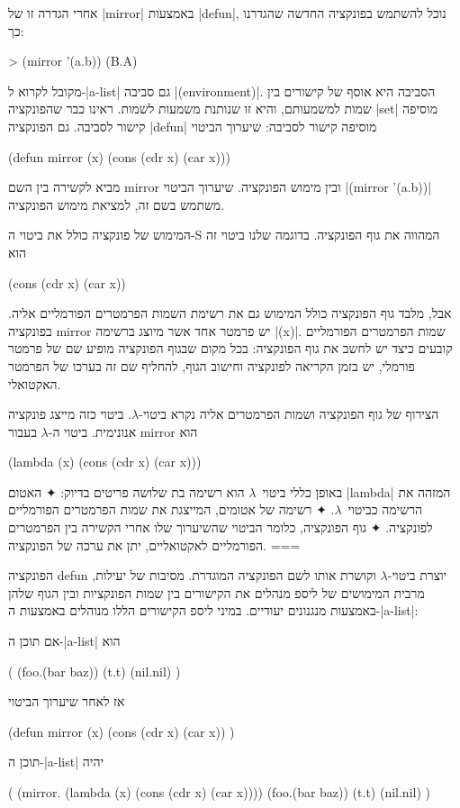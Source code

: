 אחרי הגדרה זו של \E|mirror| באמצעות \E|defun|, נוכל להשתמש בפונקציה החדשה
שהגדרנו כך:
\begin{LISP}
> (mirror '(a.b))
(B.A)
\end{LISP}

מקובל לקרוא ל-\E|a-list| גם סביבה \E|(environment)|. הסביבה היא אוסף של קישורים
בין שמות למשמעותם, והיא זו שנותנת משמעות לשמות. ראינו כבר שהפונקציה \E|set|
מוסיפה קישור לסביבה. גם הפונקציה \E|defun| מוסיפה קישור לסביבה: שיערוך הביטוי
\begin{LISP}
(defun mirror (x) (cons (cdr x) (car x)))
\end{LISP}
מביא לקשירה בין השם mirror ובין מימוש הפונקציה. שיערוך הביטוי \T|(mirror
'(a.b))| משתמש בשם זה, למציאת מימוש הפונקציה.

המימוש של פונקציה כולל את ביטוי ה-S המהווה את גוף הפונקציה. בדוגמה שלנו ביטוי
זה הוא
\begin{LISP}
(cons (cdr x) (car x))
\end{LISP}
אבל, מלבד גוף הפונקציה כולל המימוש גם את רשימת השמות הפרמטרים הפורמליים אליה.
בפונקציה mirror יש פרמטר אחד אשר מיוצג ברשימה \T|(x)|. שמות הפרמטרים הפורמליים
קובעים כיצד יש לחשב את גוף הפונקציה: בכל מקום שבגוף הפונקציה מופיע שם של פרמטר
פורמלי, יש בזמן הקריאה לפונקציה וחישוב הגוף, להחליף שם זה בערכו של הפרמטר
האקטואלי.

הצירוף של גוף הפונקציה ושמות הפרמטרים אליה נקרא ביטוי-$λ$. ביטוי כזה
מייצג פונקציה אנונימית. ביטוי ה-$λ$ בעבור mirror הוא
\begin{LISP}
  (lambda (x) (cons (cdr x) (car x)))
\end{LISP}
באופן כללי ביטוי~$λ$ הוא רשימה בת שלושה פריטים בדיוק:
✦ האטום \T|lambda| המזהה את הרשימה כביטוי~$λ$.
✦ רשימה של אטומים, המייצגת את שמות הפרמטרים הפורמליים לפונקציה.
✦ גוף הפונקציה, כלומר הביטוי שהשיערוך שלו אחרי הקשירה בין הפרמטרים
הפורמליים לאקטואליים, יתן את ערכה של הפונקציה.
===

הפונקציה defun יוצרת ביטוי-$λ$ וקושרת אותו לשם הפונקציה המוגדרת. מסיבות של
יעילות, מרבית המימושים של ליספ מנהלים את הקישורים בין שמות הפונקציות ובין הגוף
שלהן באמצעות מנגנונים יעודיים. במיני ליספ הקישורים הללו מנוהלים באמצעות
ה-\E|a-list|:

אם תוכן ה-\E|a-list| הוא
\begin{LISP}
(
  (foo.(bar baz))
  (t.t)
  (nil.nil)
)
\end{LISP}
אז לאחר שיערוך הביטוי
\begin{LISP}
(defun
  mirror (x)
  (cons (cdr x) (car x))
)
\end{LISP}
תוכן ה-\E|a-list| יהיה
\begin{LISP}
(
  (mirror.
     (lambda (x)
        (cons (cdr x) (car x))))
  (foo.(bar baz))
  (t.t)
  (nil.nil)
)
\end{LISP}

